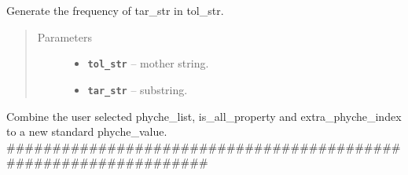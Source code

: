 \documentclass[letterpaper,10pt,english]{sphinxmanual}
\begin{document}
\begin{fulllineitems}
\label{reference/PyPretreatDNA:PyPretreatDNA.ConvertPhycheIndexToDict}
\end{fulllineitems}


\begin{fulllineitems}
\label{reference/PyPretreatDNA:PyPretreatDNA.DNAChecks}
\end{fulllineitems}


\begin{fulllineitems}
\label{reference/PyPretreatDNA:PyPretreatDNA.Frequency}
Generate the frequency of tar\_str in tol\_str.
\begin{quote}\begin{description}
\item[{Parameters}] \leavevmode\begin{itemize}
\item {} 
\textbf{\texttt{tol\_str}} -- mother string.

\item {} 
\textbf{\texttt{tar\_str}} -- substring.

\end{itemize}

\end{description}\end{quote}

\end{fulllineitems}


\begin{fulllineitems}
\label{reference/PyPretreatDNA:PyPretreatDNA.GeneratePhycheValue}
Combine the user selected phyche\_list, is\_all\_property and 
extra\_phyche\_index to a new standard phyche\_value.
\#\#\#\#\#\#\#\#\#\#\#\#\#\#\#\#\#\#\#\#\#\#\#\#\#\#\#\#\#\#\#\#\#\#\#\#\#\#\#\#\#\#\#\#\#\#\#\#\#\#\#\#\#\#\#\#\#\#\#\#\#\#\#\#\#

\end{fulllineitems}
\end{document}
